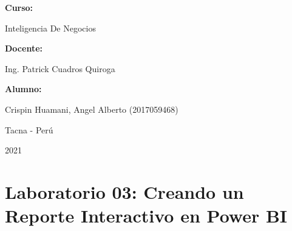\documentclass[12pt,letterpaper]{article}
\begin{document}
\begin{titlepage}
\begin{center}
\vspace*{0.3in}
\begin{Large}
\textbf{Curso:} \\
\end{Large}

\vspace*{0.1in}
\begin{large}
    Inteligencia De Negocios\\
\end{large}

\vspace*{0.3in}
\begin{Large}
\textbf{Docente:} \\
\end{Large}

\vspace*{0.1in}
\begin{large}
Ing. Patrick Cuadros Quiroga\\
\end{large}

\vspace*{0.2in}
\vspace*{0.1in}
\begin{large}
\textbf{Alumno:} \\
\begin{flushleft}
    Crispin Huamani, Angel Alberto		\hfill	(2017059468) \\


\end{flushleft}
\end{large}
\vspace*{0.1in}
\begin{large}
Tacna - Perú\\
\end{large}
\vspace*{0.1in}
\begin{large}
2021\\
\end{large}

\end{center}

\end{titlepage}




\thispagestyle{empty} %
\newpage
\setcounter{page}{1} %



\section*{Laboratorio 03: Creando un Reporte Interactivo en Power BI}
\end{document}
